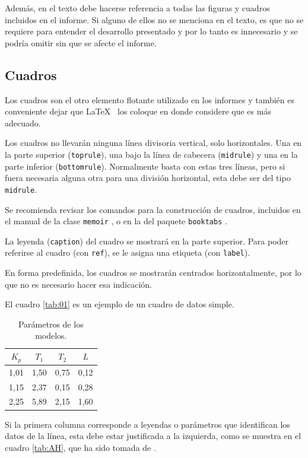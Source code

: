 Además, en el texto debe hacerse referencia a todas las figuras y cuadros incluidos en el informe.  Si alguno de ellos no se menciona en el texto, es que no se requiere para entender el desarrollo presentado y por lo tanto es innecesario y se podría omitir sin que se afecte el informe.

\subsection{Cuadros}
Los cuadros son el otro elemento flotante utilizado en los informes y también es conveniente dejar que \LaTeX~ los coloque en donde considere que es más adecuado.

Los cuadros no llevarán ninguna línea divisoria vertical, solo horizontales. Una en la parte superior (\texttt{toprule}), una bajo la línea de cabecera (\texttt{midrule}) y una en la parte inferior (\texttt{bottomrule}).  Normalmente basta con estas tres líneas, pero si fuera necesaria alguna otra para una división horizontal, esta debe ser del tipo \texttt{midrule}.

Se recomienda revisar los comandos para la construcción de cuadros, incluidos en el manual de la clase \texttt{memoir} \cite{memoir2011}, o en la del paquete \texttt{booktabs} \cite{fear2005}.

La leyenda (\texttt{caption}) del cuadro se mostrará en la parte superior.  Para poder referirse al cuadro (con \texttt{ref}), se le asigna una etiqueta (con \texttt{label}).

En forma predefinida, los cuadros se mostrarán centrados horizontalmente, por lo que no es necesario hacer esa indicación. 

El cuadro \ref{tab:01} es un ejemplo de un cuadro de datos simple.

\begin{table}
\caption{Parámetros de los modelos.} \label{tab:01o}
		\begin{tabular}{@{}*{4}{c}@{}}
    \toprule
    $K_p$ & $T_1$ & $T_2$ & $L$ \\
    \midrule
     1,01 & 1,50 & 0,75 & 0,12 \\
		 1,15 & 2,37 & 0,15 & 0,28 \\
		 2,25 & 5,89 & 2,15 & 1,60 \\
    \bottomrule
    \end{tabular}
\end{table}

Si la primera columna corresponde a leyendas o parámetros que identifican los datos de la línea, esta debe estar justificada a la izquierda, como se muestra en el cuadro \ref{tab:AH}, que ha sido tomada de \cite{astromhagglund2006}.

